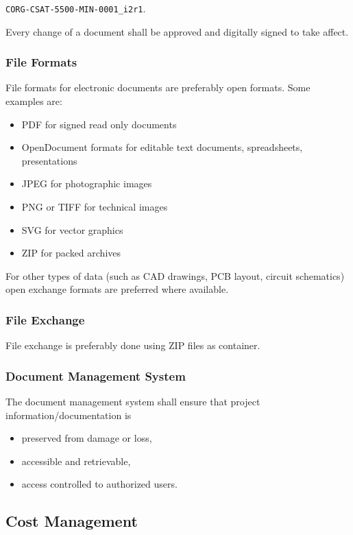 \texttt{CORG-CSAT-5500-MIN-0001\_i2r1}.

Every change of a document shall be approved and digitally signed to take affect.

\subsubsection{File Formats}

File formats for electronic documents are preferably open formats. Some examples are:

\begin{itemize}
\item PDF for signed read only documents
\item OpenDocument formats for editable text documents, spreadsheets, presentations
\item JPEG for photographic images
\item PNG or TIFF for technical images
\item SVG for vector graphics
\item ZIP for packed archives
\end{itemize}

For other types of data (such as CAD drawings, PCB layout, circuit schematics) open exchange formats are preferred where available.

\subsubsection{File Exchange}

File exchange is preferably done using ZIP files as container.

\subsubsection{Document Management System}

The document management system shall ensure that project information/documentation is

\begin{itemize}
\item preserved from damage or loss,
\item accessible and retrievable,
\item access controlled to authorized users.
\end{itemize}

\subsection{Cost Management}

